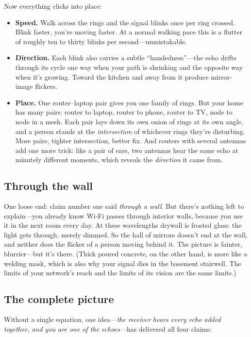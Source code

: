 \documentclass[11pt, letterpaper]{article}
\begin{document}
Now everything clicks into place:

\begin{itemize}[nosep]
  \item \textbf{Speed.} Walk across the rings and the signal blinks once per ring crossed. Blink faster, you're moving faster. At a normal walking pace this is a flutter of roughly ten to thirty blinks per second---unmistakable.
  \item \textbf{Direction.} Each blink also carries a subtle ``handedness''---the echo drifts through its cycle one way when your path is shrinking and the opposite way when it's growing. Toward the kitchen and away from it produce mirror-image flickers.
  \item \textbf{Place.} One router--laptop pair gives you one family of rings. But your home has many pairs: router to laptop, router to phone, router to TV, node to node in a mesh. Each pair lays down its own onion of rings at its own angle, and a person stands at the \textit{intersection} of whichever rings they're disturbing. More pairs, tighter intersection, better fix. And routers with several antennas add one more trick: like a pair of ears, two antennas hear the same echo at minutely different moments, which reveals the \textit{direction} it came from.
\end{itemize}

\subsection{Through the wall}

One loose end: claim number one said \textit{through a wall}. But there's nothing left to explain---you already know Wi-Fi passes through interior walls, because you use it in the next room every day. At these wavelengths drywall is frosted glass: the light gets through, merely dimmed. So the hall of mirrors doesn't end at the wall, and neither does the flicker of a person moving behind it. The picture is fainter, blurrier---but it's there. (Thick poured concrete, on the other hand, is more like a welding mask, which is also why your signal dies in the basement stairwell. The limits of your network's reach and the limits of its vision are the same limits.)

\subsection{The complete picture}

Without a single equation, one idea---\textit{the receiver hears every echo added together, and you are one of the echoes}---has delivered all four claims:
\end{document}

